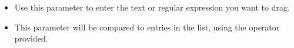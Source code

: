 
\begin{itemize}
\item Use this parameter to enter the text or regular expression  you want to drag.
\item This parameter will be compared to entries in the list, using the operator provided.
\end{itemize}
